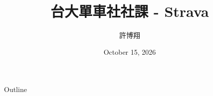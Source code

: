 \title{台大單車社社課 - Strava}
\author{許博翔}
\institute{}
\date{October 15, 2026}


\frame{\titlepage}
\begin{frame}{Outline}
\tableofcontents
\end{frame}










